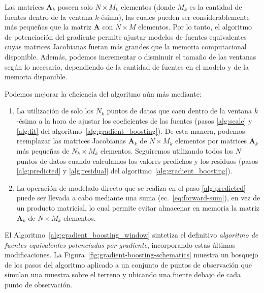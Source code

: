 Las matrices $\mathbf{A}_k$ poseen solo $N \times M_k$ elementos (donde $M_k$
es la cantidad de fuentes dentro de la ventana $k$-ésima), las cuales pueden
ser considerablemente más pequeñas que la matriz $\mathbf{A}$ con $N \times M$
elementos.
Por lo tanto, el algoritmo de potenciación del gradiente permite ajustar
modelos de fuentes equivalentes cuyas matrices Jacobianas fueran más grandes
que la memoria computacional disponible.
Además, podemos incrementar o disminuir el tamaño de las ventanas según lo
necesario, dependiendo de la cantidad de fuentes en el modelo y de la memoria
disponible.

Podemos mejorar la eficiencia del algoritmo aún más mediante:

\begin{enumerate}
  \item La utilización de solo los $N_k$ puntos de datos que caen dentro de la
      ventana $k$-ésima a la hora de ajustar los coeficientes de las fuentes
      (pasos \ref{alg:scale} y \ref{alg:fit} del
      algoritmo~\ref{alg:gradient_boosting}).
      De esta manera, podemos reemplazar las matrices Jacobianas $\mathbf{A}_k$
      de $N \times M_k$ elementos por matrices $\tilde{\mathbf{A}}_k$ más
      pequeñas de $N_k \times M_k$ elementos.
      Seguiremos utilizando todos los $N$ puntos de datos cuando calculamos los
      valores predichos y los residuos (pasos \ref{alg:predicted}
      y \ref{alg:residual} del algoritmo~\ref{alg:gradient_boosting}).
  \item La operación de modelado directo que se realiza en el paso
      \ref{alg:predicted} puede ser llevada a cabo mediante una suma
      (ec.~\ref{eq:forward-sum}), en vez de un producto matricial, lo cual
      permite evitar almacenar en memoria la matriz $\mathbf{A}_k$ de $N \times
      M_k$ elementos.
\end{enumerate}

El Algoritmo~\ref{alg:gradient_boosting_window} sintetiza el definitivo
\textit{algoritmo de fuentes equivalentes potenciadas por gradiente},
incorporando estas últimas modificaciones.
La Figura~\ref{fig:gradient-boosting-schematics} muestra un bosquejo de los
pasos del algoritmo aplicado a un conjunto de puntos de observación que simulan
una muestra sobre el terreno y ubicando una fuente debajo de cada punto de
observación.

